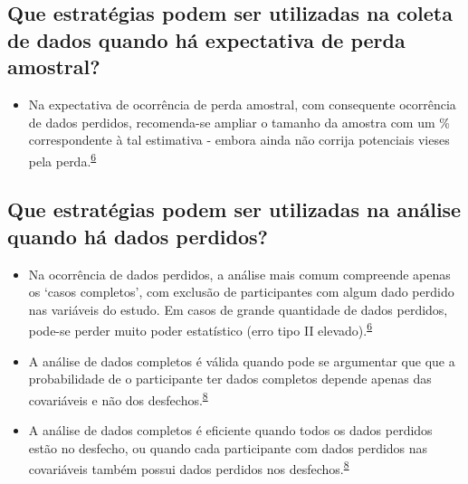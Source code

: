 \documentclass[
]{book}
\providecommand{\tightlist}{%
  \setlength{\itemsep}{0pt}\setlength{\parskip}{0pt}}
\begin{document}
\hypertarget{que-estratuxe9gias-podem-ser-utilizadas-na-coleta-de-dados-quando-huxe1-expectativa-de-perda-amostral}{%
\subsection{Que estratégias podem ser utilizadas na coleta de dados quando há expectativa de perda amostral?}\label{que-estratuxe9gias-podem-ser-utilizadas-na-coleta-de-dados-quando-huxe1-expectativa-de-perda-amostral}}

\begin{itemize}
\tightlist
\item
  Na expectativa de ocorrência de perda amostral, com consequente ocorrência de dados perdidos, recomenda-se ampliar o tamanho da amostra com um \% correspondente à tal estimativa - embora ainda não corrija potenciais vieses pela perda.\textsuperscript{\protect\hyperlink{ref-Altman2007}{6}}
\end{itemize}

\hypertarget{que-estratuxe9gias-podem-ser-utilizadas-na-anuxe1lise-quando-huxe1-dados-perdidos}{%
\subsection{Que estratégias podem ser utilizadas na análise quando há dados perdidos?}\label{que-estratuxe9gias-podem-ser-utilizadas-na-anuxe1lise-quando-huxe1-dados-perdidos}}

\begin{itemize}
\item
  Na ocorrência de dados perdidos, a análise mais comum compreende apenas os `casos completos', com exclusão de participantes com algum dado perdido nas variáveis do estudo. Em casos de grande quantidade de dados perdidos, pode-se perder muito poder estatístico (erro tipo II elevado).\textsuperscript{\protect\hyperlink{ref-Altman2007}{6}}
\item
  A análise de dados completos é válida quando pode se argumentar que que a probabilidade de o participante ter dados completos depende apenas das covariáveis e não dos desfechos.\textsuperscript{\protect\hyperlink{ref-carpenter2021}{8}}
\item
  A análise de dados completos é eficiente quando todos os dados perdidos estão no desfecho, ou quando cada participante com dados perdidos nas covariáveis também possui dados perdidos nos desfechos.\textsuperscript{\protect\hyperlink{ref-carpenter2021}{8}}
\end{itemize}
\end{document}
